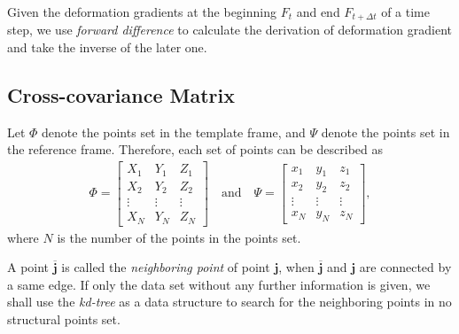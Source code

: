 \documentclass{llncs}
\begin{document}
Given the deformation gradients at the beginning $F_t$ and end $F_{t+\Delta t}$ of a time step, we use \emph{forward difference} \cite{wilmott1995mathematics} to calculate the derivation of deformation gradient and take the inverse of the later one.  

\subsection{Cross-covariance Matrix}
Let $\Phi$ denote the points set in the template frame, and $\Psi$ denote the points set in the reference frame. Therefore, each set of points can be described as
\begin{align}
\Phi=
  \begin{bmatrix}
    X_1 & Y_1 & Z_1  \\
    X_2 & Y_2 & Z_2  \\
    \vdots & \vdots & \vdots \\
    X_N & Y_N & Z_N 
  \end{bmatrix}
\quad \mbox{and} \quad
\Psi=
  \begin{bmatrix}
    x_1 & y_1 & z_1  \\
    x_2 & y_2 & z_2  \\
    \vdots & \vdots & \vdots \\
    x_N & y_N & z_N 
  \end{bmatrix},
\end{align}
where $N$ is the number of the points in the points set.

A point $\overline{\mathbf{j}}$ is called the \emph{neighboring point} of point $\mathbf{j}$, when $\overline{\mathbf{j}}$ and $\mathbf{j}$ are connected by a same edge. If only the data set without any further information is given, we shall use the \emph{kd-tree} \cite{bentley1975multidimensional} as a data structure to search for the neighboring points in no structural points set. 
\end{document}

